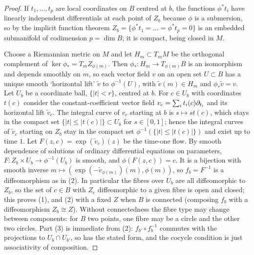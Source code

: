 \begin{proof}
If $t_1,\dots,t_p$ are local coordinates on $B$ centred at $b$, the functions
$\phi^*t_i$ have linearly independent differentials at each point of $Z_b$
because $\phi$ is a submersion, so by the implicit function theorem
$Z_b=\{\phi^*t_1=\dots=\phi^*t_p=0\}$ is an embedded submanifold of codimension
$p=\dim B$; it is compact, being closed in $M$.

Choose a Riemannian metric on $M$ and let $H_m\subset T_mM$ be the orthogonal
complement of $\ker\phi_*=T_mZ_{\phi(m)}$. Then $\phi_*:H_m\longrightarrow
T_{\phi(m)}B$ is an isomorphism and depends smoothly on $m$, so each vector field
$v$ on an open set $U\subset B$ has a unique smooth `horizontal lift' $\tilde v$ to
$\phi^{-1}(U)$, with $\tilde v(m)\in H_m$ and $\phi_*\tilde v=v$. Let $U_b$ be a
coordinate ball, $\{|t|<r\}$, centred at $b$. For $c\in U_b$ with coordinates
$t(c)$ consider the constant-coefficient vector field
$v_c=\sum_it_i(c)\partial_{t_i}$ and its horizontal lift $\tilde v_c$. The integral
curve of $v_c$ starting at $b$ is $s\mapsto st(c)$, which stays in the compact set
$\{|t|\le|t(c)|\}\subset U_b$ for $s\in[0,1]$; hence the integral curves of
$\tilde v_c$ starting on $Z_b$ stay in the compact set $\phi^{-1}(\{|t|\le
|t(c)|\})$ and exist up to time $1$. Let $F(z,c)=\exp(\tilde v_c)(z)$ be the
time-one flow. By smooth dependence of solutions of ordinary differential
equations on parameters, $F:Z_b\times U_b\longrightarrow\phi^{-1}(U_b)$ is smooth,
and $\phi(F(z,c))=c$. It is a bijection with smooth inverse
$m\longmapsto(\exp(-\tilde v_{\phi(m)})(m),\phi(m))$, so $f_b=F^{-1}$ is a
diffeomorphism as in (2). In particular the fibres
over $U_b$ are all diffeomorphic to $Z_b$, so the set of
$c\in B$ with $Z_c$ diffeomorphic to a given fibre is open and closed; this
proves (1), and (2) with a fixed $Z$ when $B$ is connected (composing $f_b$ with
a diffeomorphism $Z_b\cong Z$). Without connectedness the fibre type may change
between components: for $B$ two points, one fibre may be a circle and the other
two circles. Part (3) is immediate from (2): $f_{b'}\circ
f_b^{-1}$ commutes with the projections to $U_b\cap U_{b'}$, so has the stated
form, and the cocycle condition is just associativity of composition.
\end{proof}

